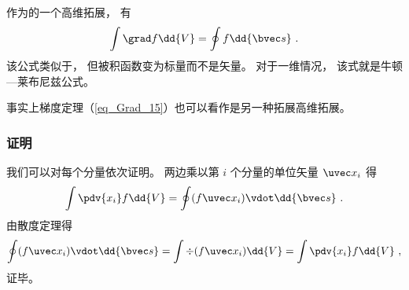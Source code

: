 

作为的一个高维拓展， 有
\begin{equation}\label{eq_NLext_3}
\int \grad f \dd{V} = \oint f \dd{\bvec s}~.
\end{equation}
该公式类似于， 但被积函数变为标量而不是矢量。 对于一维情况， 该式就是牛顿—莱布尼兹公式。

事实上梯度定理（\autoref{eq_Grad_15}）也可以看作是另一种拓展高维拓展。 

\subsubsection{证明}
我们可以对每个分量依次证明。 两边乘以第 $i$ 个分量的单位矢量 $\uvec x_i$ 得
\begin{equation}
\int \pdv{x_i}f \dd{V} = \oint (f\uvec x_i) \vdot \dd{\bvec s}~.
\end{equation}
由散度定理得
\begin{equation}
\oint (f\uvec x_i) \vdot \dd{\bvec s} = \int \div (f\uvec x_i) \dd{V} = \int \pdv{x_i} f \dd{V}~,
\end{equation}
证毕。
